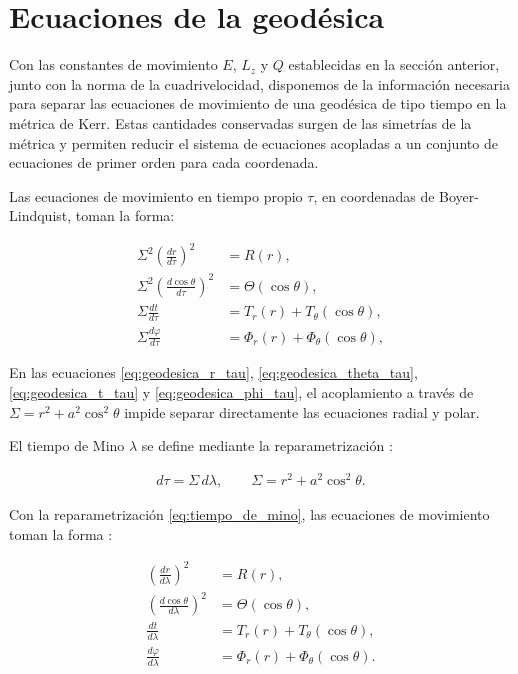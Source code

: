 \section{Ecuaciones de la geodésica}

Con las constantes de movimiento $E$, $L_z$ y $Q$ establecidas en la sección anterior, junto con la norma de la cuadrivelocidad, disponemos de la información necesaria para separar las ecuaciones de movimiento de una geodésica de tipo tiempo en la métrica de Kerr. Estas cantidades conservadas surgen de las simetrías de la métrica \cite{carter1968global} y permiten reducir el sistema de ecuaciones acopladas a un conjunto de ecuaciones de primer orden para cada coordenada.

Las ecuaciones de movimiento en tiempo propio $\tau$, en coordenadas de Boyer-Lindquist, toman la forma:

\begin{align}
    \Sigma^2 \left(\frac{dr}{d\tau}\right)^2 &= R(r), \label{eq:geodesica_r_tau} \\
    \Sigma^2 \left(\frac{d\cos\theta}{d\tau}\right)^2 &= \Theta(\cos\theta), \label{eq:geodesica_theta_tau} \\
    \Sigma \frac{dt}{d\tau} &= T_r(r) + T_\theta(\cos\theta), \label{eq:geodesica_t_tau} \\
    \Sigma \frac{d\varphi}{d\tau} &= \Phi_r(r) + \Phi_\theta(\cos\theta), \label{eq:geodesica_phi_tau}
\end{align}

En las ecuaciones \eqref{eq:geodesica_r_tau}, \eqref{eq:geodesica_theta_tau}, \eqref{eq:geodesica_t_tau} y \eqref{eq:geodesica_phi_tau}, el acoplamiento a través de $\Sigma = r^2 + a^2\cos^2\theta$ impide separar directamente las ecuaciones radial y polar.

El tiempo de Mino $\lambda$ se define mediante la reparametrización \cite{mino2003perturbative}:

\begin{align}
    d\tau = \Sigma \, d\lambda, \qquad \Sigma = r^2 + a^2\cos^2\theta. \label{eq:tiempo_de_mino}
\end{align}

Con la reparametrización \eqref{eq:tiempo_de_mino}, las ecuaciones de movimiento toman la forma \cite{fujita2009analytical}:

\begin{align}
    \left(\frac{dr}{d\lambda}\right)^2 &= R(r), \label{eq:geodesica_r_mino} \\
    \left(\frac{d\cos\theta}{d\lambda}\right)^2 &= \Theta(\cos\theta), \label{eq:geodesica_theta_mino} \\
    \frac{dt}{d\lambda} &= T_r(r) + T_\theta(\cos\theta), \label{eq:geodesica_t_mino} \\
    \frac{d\varphi}{d\lambda} &= \Phi_r(r) + \Phi_\theta(\cos\theta). \label{eq:geodesica_phi_mino}
\end{align}

